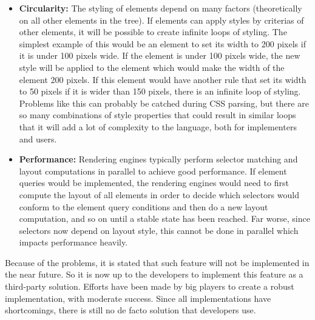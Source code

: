 \documentclass[oneside,a4paper,11pt]{kth-mag}
\begin{document}
\begin{itemize}
    \item \textbf{Circularity:} The styling of elements depend on many factors (theoretically on all other elements in the tree). If elements can apply styles by criterias of other elements, it will be possible to create infinite loops of styling. The simplest example of this would be an element to set its width to 200 pixels if it is under 100 pixels wide. If the element is under 100 pixels wide, the new style will be applied to the element which would make the width of the element 200 pixels. If this element would have another rule that set its width to 50 pixels if it is wider than 150 pixels, there is an infinite loop of styling. Problems like this can probably be catched during CSS parsing, but there are so many combinations of style properties that could result in similar loops that it will add a lot of complexity to the language, both for implementers and users.
    \item \textbf{Performance:} Rendering engines typically perform selector matching and layout computations in parallel to achieve good performance. If element queries would be implemented, the rendering engines would need to first compute the layout of all elements in order to decide which selectors would conform to the element query conditions and then do a new layout computation, and so on until a stable state has been reached. Far worse, since selectors now depend on layout style, this cannot be done in parallel which impacts performance heavily.
\end{itemize}
Because of the problems, it is stated that such feature will not be implemented in the near future. So it is now up to the developers to implement this feature as a third-party solution. Efforts have been made by big players to create a robust implementation, with moderate success. Since all implementations have shortcomings, there is still no de facto solution that developers use.
\end{document}
